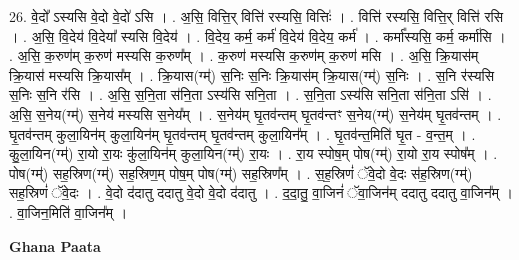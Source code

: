\documentclass[17pt]{extarticle}
\begin{document}
26. वे॒दो᳚ ऽस्यसि वे॒दो वे॒दो॑ ऽसि । . अ॒सि॒ वित्ति॒र् वित्ति॑ रस्यसि॒ वित्तिः॑ । . वित्ति॑ रस्यसि॒ वित्ति॒र् वित्ति॑ रसि । . अ॒सि॒ वि॒देय॑ वि॒देया᳚ स्यसि वि॒देय॑ । . वि॒देय॒ कर्म॒ कर्म॑ वि॒देय॑ वि॒देय॒ कर्म॑ । . कर्मा᳚स्यसि॒ कर्म॒ कर्मा॑सि । . अ॒सि॒ क॒रुण॑म् क॒रुण॑ मस्यसि क॒रुण᳚म् । . क॒रुण॑ मस्यसि क॒रुण॑म् क॒रुण॑ मसि । . अ॒सि॒ क्रि॒यास॑म् क्रि॒यास॑ मस्यसि क्रि॒यास᳚म् । . क्रि॒यास(ग्म्॑) स॒निः स॒निः क्रि॒यास॑म् क्रि॒यास(ग्म्॑) स॒निः । . स॒नि र॑स्यसि स॒निः स॒नि र॑सि । . अ॒सि॒ स॒नि॒ता स॑नि॒ता ऽस्य॑सि सनि॒ता । . स॒नि॒ता ऽस्य॑सि सनि॒ता स॑नि॒ता ऽसि॑ । . अ॒सि॒ स॒नेय(ग्म्॑) स॒नेय॑ मस्यसि स॒नेय᳚म् । . स॒नेय॑म् घृ॒तव॑न्तम् घृ॒तव॑न्तꣳ स॒नेय(ग्म्॑) स॒नेय॑म् घृ॒तव॑न्तम् । . घृ॒तव॑न्तम् कुला॒यिन॑म् कुला॒यिन॑म् घृ॒तव॑न्तम् घृ॒तव॑न्तम् कुला॒यिन᳚म् । . घृ॒तव॑न्त॒मिति॑ घृ॒त - व॒न्त॒म् । . कु॒ला॒यिन(ग्म्॑) रा॒यो रा॒यः कु॑ला॒यिन॑म् कुला॒यिन(ग्म्॑) रा॒यः । . रा॒य स्पोष॒म् पोष(ग्म्॑) रा॒यो रा॒य स्पोष᳚म् । . पोष(ग्म्॑) सह॒स्रिण(ग्म्॑) सह॒स्रिण॒म् पोष॒म् पोष(ग्म्॑) सह॒स्रिण᳚म् । . स॒ह॒स्रिणं॑ ॅवे॒दो वे॒दः स॑ह॒स्रिण(ग्म्॑) सह॒स्रिणं॑ ॅवे॒दः । . वे॒दो द॑दातु ददातु वे॒दो वे॒दो द॑दातु । . द॒दा॒तु॒ वा॒जिनं॑ ॅवा॒जिन॑म् ददातु ददातु वा॒जिन᳚म् । . वा॒जिन॒मिति॑ वा॒जिन᳚म् । \newline

\textbf{Ghana Paata } \newline
\end{document}
